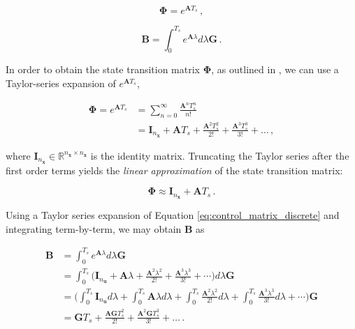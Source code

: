 \begin{equation}
  \bm{\Phi} = e^{\bm{A}T_s}\,,
\end{equation}

\begin{equation}\label{eq:control_matrix_discrete}
  \bm{B} = \int_{0}^{T_s} e^{\bm{A}\lambda}d\lambda \bm{G}\,.
\end{equation}

In order to obtain the state transition matrix $\bm{\Phi}$, as outlined in \cite{zarchan2009fundamentals}, we can use a Taylor-series expansion of $e^{\bm{A}T_s}$,

\begin{equation}\label{eq:As}
\begin{split}
  \bm{\Phi} = e^{\bm{A}T_s} &= \sum_{n=0} ^ {\infty} \frac {\bm{A}^{n} T_s^n}{n!} \\
  &= \bm{I}_{n_{\bm{x}}} + \bm{A}T_s + \frac{\bm{A}^2 T_s^2}{2!} +\frac{\bm{A}^{3} T_s^3}{3!} + \dots\,,
\end{split}
\end{equation}
 
\noindent
where $\bm{I}_{n_{\bm{x}}} \in \mathbb{R}^{{n_{\bm{x}}} \times {n_{\bm{x}}}}$ is the identity matrix. Truncating the Taylor series after the first order terms yields the \emph{linear approximation} of the state transition matrix:

\begin{equation}\label{eq:state_transition_approx}
  \bm{\Phi} \approx \bm{I}_{n_{\bm{x}}} + \bm{A}T_s\,.
\end{equation}

\noindent
Using a Taylor series expansion of Equation \ref{eq:control_matrix_discrete} and integrating term-by-term, we may obtain $\bm{B}$ as

\begin{equation}\label{eq:Bs}
\begin{split}
\bm{B} &= \int_{0}^{T_s} e^{\bm{A}\lambda}d\lambda \bm{G} \\
   &= \int_{0}^{T_s} \bigg( \bm{I}_{n_{\bm{u}}} + \bm{A}\lambda + \frac{\bm{A}^2\lambda^2}{2!} +\frac{\bm{A}^3\lambda^3}{3!} + \cdots \bigg) d\lambda \bm{G} \\
   &= \Bigg( \int_{0}^{T_s}\bm{I}_{n_{\bm{u}}} d\lambda + \int_{0}^{T_s}\bm{A}\lambda d\lambda + \int_{0}^{T_s}\frac{\bm{A}^2\lambda^2}{2!} d\lambda + \int_{0}^{T_s}\frac{\bm{A}^3\lambda^3}{3!} d\lambda + \cdots \Bigg) \bm{G} \\
   &= \bm{G}T_s + \frac{\bm{A}\bm{G}T_s^2}{2!} + \frac{\bm{A}^2\bm{G}T_s^3}{3!} + \dots \,.
\end{split}
\end{equation}
 

